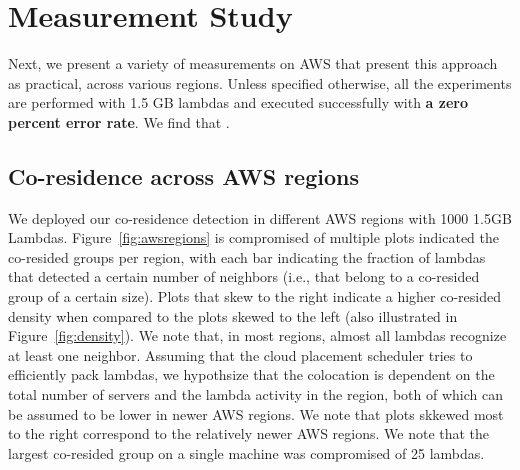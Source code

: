 \section{Measurement Study}
\label{sec:study}

Next, we present a variety of measurements on AWS that present this approach as
practical, across various regions. Unless specified otherwise, all the
experiments are performed with 1.5 GB lambdas and executed successfully with
\textbf{a zero percent error rate}. We find that .


\subsection{Co-residence across AWS regions}
We deployed our co-residence detection in different AWS regions with 1000 1.5GB
Lambdas. Figure~\ref{fig:awsregions} is compromised of multiple plots indicated
the co-resided groups per region, with each bar indicating the fraction of
lambdas that detected a certain number of neighbors (i.e., that belong to a
co-resided group of a certain size). Plots that skew to the right indicate a
higher co-resided density when compared to the plots skewed to the left (also
illustrated in Figure~\ref{fig:density}). We note that, in most regions, almost
all lambdas recognize at least one neighbor.
Assuming that the cloud placement scheduler tries to efficiently 
pack lambdas, we hypothsize that the colocation is dependent on the total number
of servers and the lambda activity in the region, both of which can be assumed
to be lower in newer AWS regions. We note that plots skkewed most to the right
correspond to the relatively newer AWS regions.  We note that the largest
co-resided group on a single machine was compromised of 25 lambdas.


